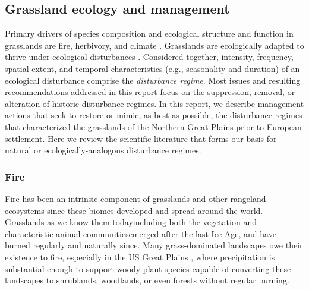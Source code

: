 \subsection{Grassland ecology and management}\label{ssec:ecol}

Primary drivers of species composition and ecological structure and function in grasslands are fire, herbivory, and climate \citep{blair2014}.
Grasslands are ecologically adapted to thrive under ecological disturbances \citep{samson2004}. 
Considered together, intensity, frequency, spatial extent, and temporal characteristics (e.g., seasonality and duration) of an ecological disturbance comprise the \emph{disturbance regime}. 
Most issues and resulting recommendations addressed in this report focus on the suppression, removal, or alteration of historic disturbance regimes. 
In this report, we describe management actions that seek to restore or mimic, as best as possible, the disturbance regimes that characterized the grasslands of the Northern Great Plains prior to European settlement. 
Here we review the scientific literature that forms our basis for natural or ecologically-analogous disturbance regimes.  

\subsubsection{Fire}

Fire has been an intrinsic component of grasslands and other rangeland ecosystems since these biomes developed and spread around the world. 
Grasslands as we know them today\textemdash including both the vegetation and characteristic animal communities\textemdash emerged after the last Ice Age, and have burned regularly and naturally since. 
Many grass-dominated landscapes owe their existence to fire, especially in the US Great Plains \citep{axelrod1985}, where precipitation is substantial enough to support woody plant species capable of converting these landscapes to shrublands, woodlands, or even forests without regular burning.

